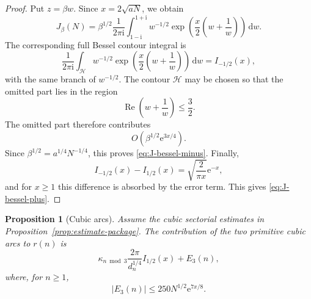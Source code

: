 \documentclass[10pt,a4paper]{amsart}
\newtheorem{proposition}[theorem]{Proposition}
\newcommand{\ii}{\mathrm i}
\newcommand{\e}{\mathrm e}
\newcommand{\dd}{\mathrm d}
\newcommand{\Repart}{\operatorname{Re}}
\begin{document}
\begin{proof}
Put $z=\beta w$. Since $x=2\sqrt{aN}$, we obtain
\[
J_\beta(N)
=
\beta^{1/2}
\frac1{2\pi\ii}
\int_{1-\ii}^{1+\ii}
w^{-1/2}
\exp\left(\frac{x}{2}\left(w+\frac1w\right)\right)\,\dd w.
\]
The corresponding full Bessel contour integral is
\[
\frac1{2\pi\ii}
\int_{\mathcal H}
w^{-1/2}
\exp\left(\frac{x}{2}\left(w+\frac1w\right)\right)\,\dd w
=
I_{-1/2}(x),
\]
with the same branch of $w^{-1/2}$. The contour $\mathcal H$ may be chosen so that the omitted part lies in the region
\[
\Repart\left(w+\frac1w\right)\leq \frac32.
\]
The omitted part therefore contributes
\[
O\left(\beta^{1/2}\e^{3x/4}\right).
\]
Since $\beta^{1/2}=a^{1/4}N^{-1/4}$, this proves \eqref{eq:J-bessel-minus}. Finally,
\[
I_{-1/2}(x)-I_{1/2}(x)
=
\sqrt{\frac{2}{\pi x}}\e^{-x},
\]
and for $x\geq1$ this difference is absorbed by the error term. This gives \eqref{eq:J-bessel-plus}.
\end{proof}

\begin{proposition}[Cubic arcs]\label{prop:cubic-arcs}
Assume the cubic sectorial estimates in Proposition~\ref{prop:estimate-package}. The contribution of the two primitive cubic arcs to $r(n)$ is
\begin{equation}\label{eq:cubic-contribution}
\kappa_{n\bmod3}
\frac{2\pi}{d_n^{1/4}}
I_{1/2}(x)
+
E_3(n),
\end{equation}
where, for $n\geq1$,
\begin{equation}\label{eq:cubic-error}
|E_3(n)|\leq250N^{1/2}\e^{7x/8}.
\end{equation}
\end{proposition}
\end{document}
